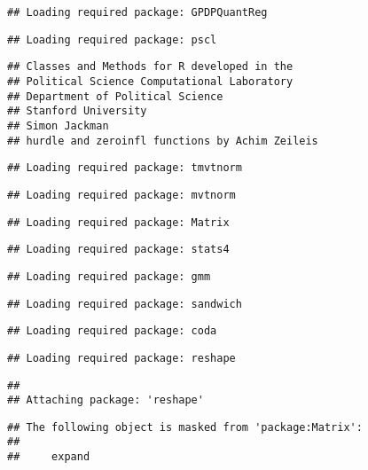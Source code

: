 \documentclass[11pt,]{article}
\begin{document}
\begin{verbatim}
## Loading required package: GPDPQuantReg
\end{verbatim}

\begin{verbatim}
## Loading required package: pscl
\end{verbatim}

\begin{verbatim}
## Classes and Methods for R developed in the
## Political Science Computational Laboratory
## Department of Political Science
## Stanford University
## Simon Jackman
## hurdle and zeroinfl functions by Achim Zeileis
\end{verbatim}

\begin{verbatim}
## Loading required package: tmvtnorm
\end{verbatim}

\begin{verbatim}
## Loading required package: mvtnorm
\end{verbatim}

\begin{verbatim}
## Loading required package: Matrix
\end{verbatim}

\begin{verbatim}
## Loading required package: stats4
\end{verbatim}

\begin{verbatim}
## Loading required package: gmm
\end{verbatim}

\begin{verbatim}
## Loading required package: sandwich
\end{verbatim}

\begin{verbatim}
## Loading required package: coda
\end{verbatim}

\begin{verbatim}
## Loading required package: reshape
\end{verbatim}

\begin{verbatim}
## 
## Attaching package: 'reshape'
\end{verbatim}

\begin{verbatim}
## The following object is masked from 'package:Matrix':
## 
##     expand
\end{verbatim}
\end{document}
